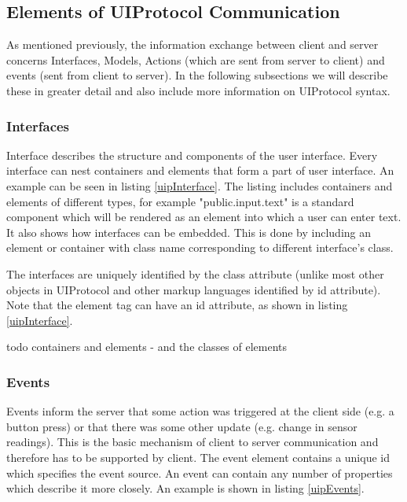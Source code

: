 



\subsection{Elements of UIProtocol Communication}
As mentioned previously, the information exchange between client and server concerns Interfaces, Models, Actions (which are sent from server to client) and events (sent from client to server). In the following subsections we will describe these in greater detail and also include more information on UIProtocol syntax.

\subsubsection{Interfaces}
Interface describes the structure and components of the user interface. Every interface can nest containers and elements that form a part of user interface. An example can be seen in listing \ref{uipInterface}. The listing includes containers and elements of different types, for example "public.input.text" is a standard component which will be rendered as an element into which a user can enter text. It also shows how interfaces can be embedded. This is done by including an element or container with class name corresponding to different interface's class.

The interfaces are uniquely identified by the class attribute (unlike most other objects in UIProtocol and other markup languages identified by id attribute). Note that the element tag can have an id attribute, as shown in listing \ref{uipInterface}.


todo containers and elements - and the classes of elements

\subsubsection{Events}
Events inform the server that some action was triggered at the client side (e.g. a button press) or that there was some other update (e.g. change in sensor readings). This is the basic mechanism of client to server communication and therefore has to be supported by client. The event element contains a unique id which specifies the event source. An event can contain any number of properties which describe it more closely. An example is shown in listing \ref{uipEvents}.


